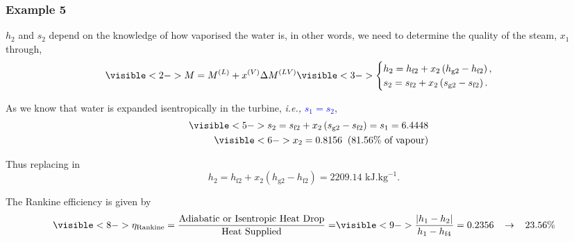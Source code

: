 \documentclass[10pt,compress]{beamer}
\newcommand{\frc}{\displaystyle\frac}
\newcommand{\blue}{\textcolor{blue}}
\newcommand{\ie}{{\it i.e., }}
\newcommand{\mfr}[3][error]{#1_{#2}^{\left(#3\right)}}
\begin{document}
\begin{frame}
   \frametitle{Example 5}
          {$h_{2}$ and $s_{2}$ depend on the knowledge of how vaporised the water is, in other words, we need to determine the quality of the steam, $x_{1}$ through},
         \begin{displaymath}
              \visible<2->{M = \mfr[M]{}{L} + \mfr[x]{}{V}\Delta\mfr[M]{}{LV}}
              \visible<3->{ \begin{cases}
                      h_{2} = h_{\text{f}2} + x_{2}\left(h_{\text{g}2} - h_{\text{f}2}\right), \\
                      s_{2} = s_{\text{f}2} + x_{2}\left(s_{\text{g}2} - s_{\text{f}2}\right).  
              \end{cases}}
         \end{displaymath}

          {As we know that water is expanded isentropically in the turbine, \ie \blue{$s_{1}=s_{2}$},}
         \begin{eqnarray}
             && \visible<5-> {s_{2} = s_{\text{f}2} + x_{2}\left(s_{\text{g}2} - s_{\text{f}2}\right) = s_{1} = 6.4448}  \nonumber \\
             && \visible<6-> {x_{2} = 0.8156 \;\;(81.56\% \text{ of vapour})}\nonumber
         \end{eqnarray}

          {Thus replacing in 
             \begin{displaymath}
                h_{2} = h_{\text{f}2} + x_{2}\left(h_{\text{g}2} - h_{\text{f}2}\right) = 2209.14\text{ kJ.kg}^{-1}.
             \end{displaymath}}

          {The Rankine efficiency is given by}
             \begin{displaymath}
                 \visible<8-> {\eta_{\text{Rankine}} = \frc{\text{Adiabatic or Isentropic Heat Drop}}{\text{Heat Supplied}} =} \visible<9-> {\frc{\left|h_{1}-h_{2}\right|}{h_{1}-h_{\text{f}4}} = 0.2356\;\;\;\rightarrow \;\;\; 23.56\%}
             \end{displaymath}
\end{frame}
\end{document}
